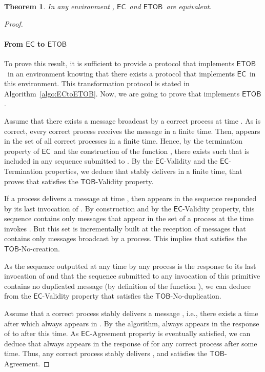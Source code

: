 \documentclass[11pt]{article}
\newtheorem{theorem}{Theorem}
\newcommand{\EC}{\ensuremath{\mathsf{EC}}}
\newcommand{\ETOB}{\ensuremath{\mathsf{ETOB}}}
\newcommand{\TOB}{\ensuremath{\mathsf{TOB}}}
\begin{document}
\begin{theorem}\label{th:EquivalenceECETOB}
In any environment , \EC~and \ETOB~are equivalent.
\end{theorem}
\begin{proof}
\paragraph{From {\EC} to {\ETOB}} 
To prove this result, it is sufficient to provide a protocol that
implements \ETOB~in an environment  knowing that there
exists a protocol that implements \EC~in this environment. This
transformation protocol  is stated
in Algorithm~\ref{algo:ECtoETOB}. 
Now,  we are going to prove that  implements \ETOB.

Assume that there exists a message  broadcast by a correct process
 at time . As  is correct, every correct process receives
the message  in a finite time. Then,  appears in the set
 of all correct processes in a finite time. Hence, by the
termination property of \EC~and the construction of the function
, there exists  such that  is included in any
sequence submitted to . By the \EC-Validity
and the \EC-Termination properties, we deduce that  stably delivers  in a finite time, that proves that  satisfies the \TOB-Validity property.

If a process  delivers a message  at time , then 
appears in the sequence responded by its last invocation of
. By construction and by the \EC-Validity
property, this sequence contains only messages that appear in the set  of a process  at the time  invokes . But this set is incrementally built at the reception of messages  that contains only messages broadcast by a process. This implies that  satisfies the \TOB-No-creation.

As the sequence outputted at any time by any process is the response to its last invocation of  and that the sequence submitted to any invocation of this primitive contains no duplicated message (by definition of the function ), we can deduce from the \EC-Validity property that  satisfies the \TOB-No-duplication.

Assume that a correct process  stably delivers a message ,
i.e., there exists a time after which  always appears in .
By the algorithm,  always appears in the response of
 to  after this time.
As \EC-Agreement property is eventually satisfied, we can deduce that
 always appears in the response of  for any
correct process after some time. Thus, any correct process stably
delivers , and  satisfies the \TOB-Agreement.


\end{proof}
\end{document}
